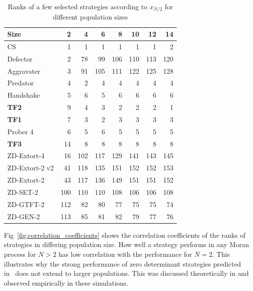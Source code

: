 \documentclass[10pt,letterpaper]{article}
\begin{document}
\begin{table}[!hbtp]
    \centering
    \scriptsize
        \begin{tabular}{lrrrrrrr}
        \toprule
                   Size &      2 &      4 &      6 &      8 &     10 &     12 &     14 \\
        \midrule
                     CS &    1 &    1 &    1 &    1 &    1 &    1 &    2 \\
               Defector &    2 &   78 &   99 &  106 &  110 &  113 &  120 \\
             Aggravater &    3 &   91 &  105 &  111 &  122 &  125 &  128 \\
               Predator &    4 &    2 &    4 &    4 &    4 &    4 &    4 \\
              Handshake &    5 &    6 &    5 &    6 &    6 &    6 &    6 \\
        \midrule
                    \textbf{TF2} &    9 &    4 &    3 &    2 &    2 &    2 &    1 \\
                    \textbf{TF1} &    7 &    3 &    2 &    3 &    3 &    3 &    3 \\
               Prober 4 &    6 &    5 &    6 &    5 &    5 &    5 &    5 \\
        \midrule
                    \textbf{TF3} &   14 &    8 &    8 &    8 &    8 &    8 &    8 \\
        \midrule
            ZD-Extort-4 &   16 &  102 &  117 &  129 &  141 &  143 &  145 \\
         ZD-Extort-2 v2 &   41 &  118 &  135 &  151 &  152 &  152 &  153 \\
            ZD-Extort-2 &   43 &  117 &  136 &  149 &  151 &  151 &  152 \\
               ZD-SET-2 &  100 &  110 &  110 &  108 &  106 &  106 &  108 \\
              ZD-GTFT-2 &  112 &   82 &   80 &   77 &   75 &   75 &   74 \\
               ZD-GEN-2 &  113 &   85 &   81 &   82 &   79 &   77 &   76 \\
        \bottomrule
        \end{tabular}
    \caption{Ranks of a few selected strategies according to \(x_{N/2}\) for different
    population sizes}
    \label{tbl:ranks_v_size_coexist}
\end{table}


Fig~\ref{fig:correlation_coefficients} shows the correlation coefficients
of the ranks of strategies in differing population size. How well a strategy
performs in any Moran process for \(N>2\) has
low correlation with the performance for \(N=2\). This illustrates why the strong
performance of zero determinant strategies predicted in~\cite{Press2012} does
not extend to larger populations. This was discussed theoretically in
\cite{Adami2013} and observed empirically in these simulations.
\end{document}
